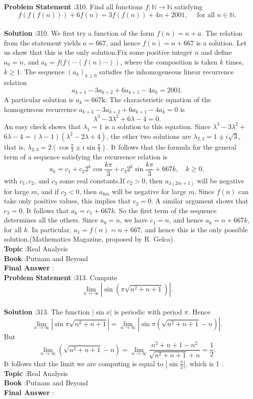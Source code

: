 \documentclass[10pt]{article}
\begin{document}
\textbf{Problem Statement} :310. Find all functions $f: \mathbb{N} \rightarrow \mathbb{N}$ satisfying$$ f(f(f(n)))+6 f(n)=3 f(f(n))+4 n+2001, \quad \text { for all } n \in \mathbb{N} . $$\\
\textbf{Solution} :310. We first try a function of the form $f(n)=n+a$. The relation from the statement yields $a=667$, and hence $f(n)=n+667$ is a solution. Let us show that this is the only solution.Fix some positive integer $n$ and define $a_{0}=n$, and $a_{k}=f(f(\cdots(f(n) \cdots))$, where the composition is taken $k$ times, $k \geq 1$. The sequence $\left(a_{k}\right)_{k \geq 0}$ satisfies the inhomogeneous linear recurrence relation$$ a_{k+3}-3 a_{k+2}+6 a_{k+1}-4 a_{k}=2001 . $$A particular solution is $a_{k}=667 \mathrm{k}$. The characteristic equation of the homogeneous recurrence $a_{k+3}-3 a_{k+2}+6 a_{k+1}-4 a_{k}=0$ is $$ \lambda^{3}-3 \lambda^{2}+6 \lambda-4=0 . $$An easy check shows that $\lambda_{1}=1$ is a solution to this equation. Since $\lambda^{3}-3 \lambda^{2}+$ $6 \lambda-4=(\lambda-1)\left(\lambda^{2}-2 \lambda+4\right)$, the other two solutions are $\lambda_{2,3}=1 \pm i \sqrt{3}$, that is, $\lambda_{2,3}=2\left(\cos \frac{\pi}{3} \pm i \sin \frac{\pi}{3}\right)$. It follows that the formula for the general term of a sequence satisfying the recurrence relation is$$ a_{k}=c_{1}+c_{2} 2^{k} \cos \frac{k \pi}{3}+c_{3} 2^{k} \sin \frac{k \pi}{3}+667 k, \quad k \geq 0, $$with $c_{1}, c_{2}$, and $c_{3}$ some real constants.If $c_{2}>0$, then $a_{3(2 m+1)}$ will be negative for large $m$, and if $c_{2}<0$, then $a_{6 m}$ will be negative for large $m$. Since $f(n)$ can take only positive values, this implies that $c_{2}=0$. A similar argument shows that $c_{3}=0$. It follows that $a_{k}=c_{1}+667 k$. So the first term of the sequence determines all the others. Since $a_{0}=n$, we have $c_{1}=n$, and hence $a_{k}=n+667 k$, for all $k$. In particular, $a_{1}=f(n)=n+667$, and hence this is the only possible solution.(Mathematics Magazine, proposed by R. Gelca)\\
\textbf{Topic} :Real Analysis\\
\textbf{Book} :Putnam and Beyond\\
\textbf{Final Answer} :\\


\textbf{Problem Statement} :313. Compute$$ \lim _{n \rightarrow \infty}\left|\sin \left(\pi \sqrt{n^{2}+n+1}\right)\right| . $$\\
\textbf{Solution} :313. The function $|\sin x|$ is periodic with period $\pi$. Hence$$ \lim _{n \rightarrow \infty}\left|\sin \pi \sqrt{n^{2}+n+1}\right|=\lim _{n \rightarrow \infty}\left|\sin \pi\left(\sqrt{n^{2}+n+1}-n\right)\right| . $$But$$ \lim _{n \rightarrow \infty}\left(\sqrt{n^{2}+n+1}-n\right)=\lim _{n \rightarrow \infty} \frac{n^{2}+n+1-n^{2}}{\sqrt{n^{2}+n+1}+n}=\frac{1}{2} . $$It follows that the limit we are computing is equal to $\left|\sin \frac{\pi}{2}\right|$, which is 1 .\\
\textbf{Topic} :Real Analysis\\
\textbf{Book} :Putnam and Beyond\\
\textbf{Final Answer} :\\
\end{document}

